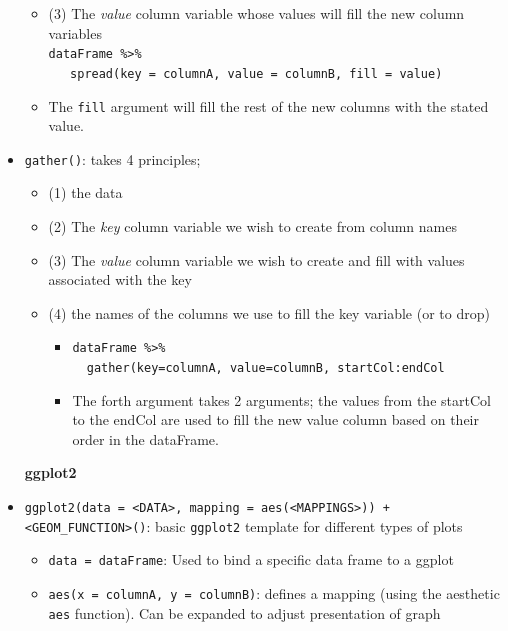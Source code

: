 \documentclass{article}
\begin{document}
\begin{itemize}
\begin{itemize}
        \item (3) The \textit{value} column variable whose values will fill the new column variables\\
        \verb|dataFrame %>%|\\ 
        \verb|   spread(key = columnA, value = columnB, fill = value)|
        \item The \verb|fill| argument will fill the rest of the new columns with the stated value.
    \end{itemize}
    \item \verb|gather()|: takes 4 principles;
    \begin{itemize}
        \item (1) the data
        \item (2) The \textit{key} column variable we wish to create from column names
        \item (3) The \textit{value} column variable we wish to create and fill with values associated with the key
        \item (4) the names of the columns we use to fill the key variable (or to drop)
        \begin{itemize}
            \item \verb|dataFrame %>%|\\
            \verb|  gather(key=columnA, value=columnB, startCol:endCol|
        \end{itemize}
        \begin{itemize}
            \item The forth argument takes 2 arguments; the values from the startCol to the endCol are used to fill the new value column based on their order in the dataFrame.
        \end{itemize}
    \end{itemize}
    \begin{center}
        \textbf{ggplot2}  
    \end{center}
    \item \verb|ggplot2(data = <DATA>, mapping = aes(<MAPPINGS>)) + |\\
    \verb|<GEOM_FUNCTION>()|: basic \verb|ggplot2| template for different types of plots
    \begin{itemize}
        \item \verb|data = dataFrame|: Used to bind a specific data frame to a ggplot
        \item \verb|aes(x = columnA, y = columnB)|: defines a mapping (using the aesthetic \verb|aes| function). Can be expanded to adjust presentation of graph

\end{itemize}
\end{itemize}
\end{document}
